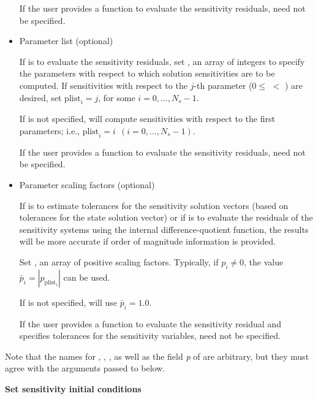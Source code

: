 \begin{Steps}
\begin{itemize}
      If the user provides a function to evaluate the sensitivity residuals,
       need not be specified.

    \item Parameter list (optional)

      If {\idas} is to evaluate the sensitivity residuals,
      set , an array of  integers to specify the 
      parameters  with respect to which solution sensitivities are to be computed.
      If sensitivities with respect to the $j$-th parameter 
      ($0 \leq $  $<$ ) are desired, set
      ${\text{plist}}_i = j$, for some $i=0,\ldots, N_s-1$.

      If  is not specified, {\idas} will compute sensitivities with respect
      to the first  parameters; i.e., ${\text{plist}}_i = i ~~ (i=0,\ldots,N_s-1)$.

      If the user provides a function to evaluate the sensitivity residuals,
       need not be specified.

    \item Parameter scaling factors (optional)

      If {\idas} is to estimate tolerances for the sensitivity solution vectors (based
      on tolerances for the state solution vector) or if {\idas} is to evaluate 
      the residuals of the sensitivity systems using the internal difference-quotient
      function, the results will be more accurate if order of magnitude information is provided.

      Set , an array of  positive scaling factors. Typically,
      if $p_i \ne 0$, the value ${\bar p}_i = |p_{\text{plist}_i}|$ can be used.

      If  is not specified, {\idas} will use ${\bar p}_i = 1.0$.

      If the user provides a function to evaluate the sensitivity residual and specifies
      tolerances for the sensitivity variables,  need not be specified.

    \end{itemize}

    Note that the names for , , , as well as the field
    {\em p} of  are arbitrary, but they must agree with the arguments
    passed to  below.

\item
  {\bf Set sensitivity initial conditions}


\end{Steps}
